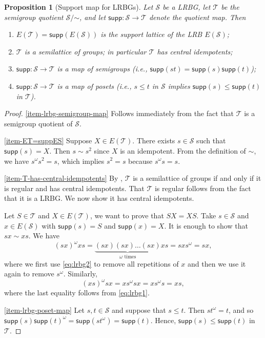 \documentclass[11pt, oneside, reqno]{amsart}
\newtheorem{prop}[theorem]{Proposition}
\theoremstyle{definition}
\numberwithin{equation}{section}
\def \SS{{\mathcal{S}}}
\def \TT{{\mathcal{T}}}
\def \supp{\mathsf{supp}}
\begin{document}
\begin{prop}[Support map for LRBGs]
    \label{prop:T-cetr-idem}
    Let $\SS$ be a LRBG, let $\TT$ be the semigroup quotient $\SS/\mathord{\sim}$,
    and let $\supp: \SS \longrightarrow  \TT$ denote the quotient map.
    Then
    \begin{enumerate}[start=0]
        \item\label{item-ET=suppES}
            $E(\TT) = \supp(E(\SS))$ is the support lattice of the LRB $E(\SS)$;

        \item\label{item-T-has-central-idempotents}
            $\TT$ is a semilattice of groups; in particular $\TT$ has central idempotents;

        \item\label{item-lrbg-semigroup-map}
            $\supp: \SS \to \TT$ is a map of semigroups
            (i.e., $\supp(st) = \supp(s) \supp(t)$);

        \item\label{item-lrbg-poset-map}
            $\supp: \SS \xrightarrow{} \TT$ is a map of posets
            (i.e., $s \leq t$ in $\SS$ implies $\supp(s) \leq \supp(t)$ in $\TT$).
    \end{enumerate}
\end{prop}
\begin{proof}
    \eqref{item-lrbg-semigroup-map} Follows immediately from the fact that
    $\TT$ is a semigroup quotient of $\SS$.

    \eqref{item-ET=suppES}
    Suppose $X \in E(\TT)$. There exists $s \in \SS$ such that $\supp(s) = X$.
    Then $s \sim s^2$ since $X$ is an idempotent.
    From the definition of $\sim$, we have $s^\omega s^2 = s$, which implies
    $s^2 = s$ because $s^\omega s = s$.

    \eqref{item-T-has-central-idempotents}
    By \cite{cp61semigroupsI}, $\TT$ is a semilattice of groups if and only if
    it is regular and has central idempotents.
    That $\TT$ is regular follows from the fact that it is a LRBG.
    We now show it has central idempotents.

    Let $S \in \TT$ and $X \in E(\TT)$, we want to prove that $SX = XS$.
    Take $s \in \SS$ and $x \in E(\SS)$ with $\supp(s) = S$ and $\supp(x) = X$.
    It is enough to show that $sx \sim xs$.
    We have
    \[
        (sx)^\omega xs = \underbrace{(sx)(sx) \dots (sx)}_{\omega\text{ times}} xs = s x s^\omega = s x,
    \]
    where we first use \cref{eq:lrbg2} to remove all repetitions of $x$ and then we use it again to remove $s^\omega$.
    Similarly,
    \[
        (xs)^\omega sx = x s^\omega s x = x s^\omega s = x s,
    \]
    where the last equality follows from \cref{eq:lrbg1}.

    \eqref{item-lrbg-poset-map}
    Let $s, t \in \SS$ and suppose that $s \leq t$.
    Then $s t^\omega = t$, and so
    $\supp(s) \supp(t)^\omega = \supp(s t^\omega) = \supp(t)$.
    Hence, $\supp(s) \leq \supp(t)$ in $\TT$.
\end{proof}
\end{document}
